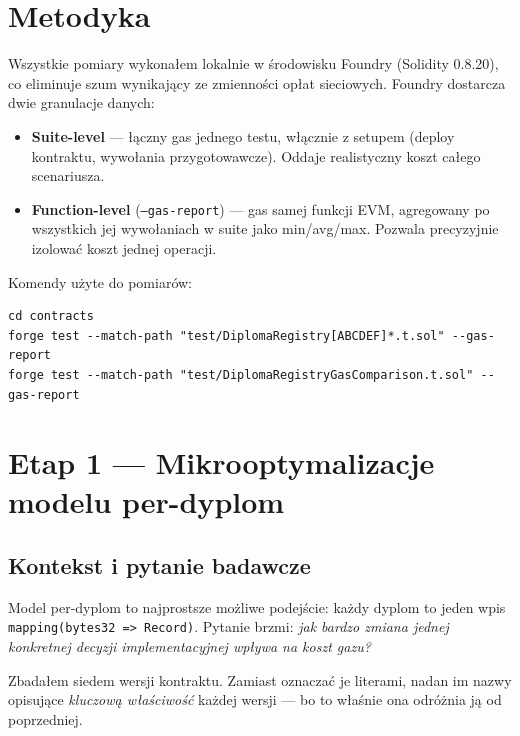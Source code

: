 \documentclass[11pt,a4paper]{article}
\begin{document}
\section{Metodyka}

Wszystkie pomiary wykonałem lokalnie w środowisku Foundry (Solidity 0.8.20),
co eliminuje szum wynikający ze zmienności opłat sieciowych.
Foundry dostarcza dwie granulacje danych:

\begin{itemize}
  \item \textbf{Suite-level} --- łączny gas jednego testu, włącznie z setupem
        (deploy kontraktu, wywołania przygotowawcze). Oddaje realistyczny
        koszt całego scenariusza.
  \item \textbf{Function-level} (\texttt{--gas-report}) --- gas samej funkcji EVM,
        agregowany po wszystkich jej wywołaniach w suite jako min/avg/max.
        Pozwala precyzyjnie izolować koszt jednej operacji.
\end{itemize}

\noindent Komendy użyte do pomiarów:
\begin{verbatim}
cd contracts
forge test --match-path "test/DiplomaRegistry[ABCDEF]*.t.sol" --gas-report
forge test --match-path "test/DiplomaRegistryGasComparison.t.sol" --gas-report
\end{verbatim}

\section{Etap 1 --- Mikrooptymalizacje modelu per-dyplom}

\subsection{Kontekst i pytanie badawcze}

Model per-dyplom to najprostsze możliwe podejście:
każdy dyplom to jeden wpis \texttt{mapping(bytes32 => Record)}.
Pytanie brzmi: \emph{jak bardzo zmiana jednej konkretnej decyzji
implementacyjnej wpływa na koszt gazu?}

Zbadałem siedem wersji kontraktu.
Zamiast oznaczać je literami, nadan im nazwy opisujące
\emph{kluczową właściwość} każdej wersji --- bo to właśnie ona
odróżnia ją od poprzedniej.
\end{document}
